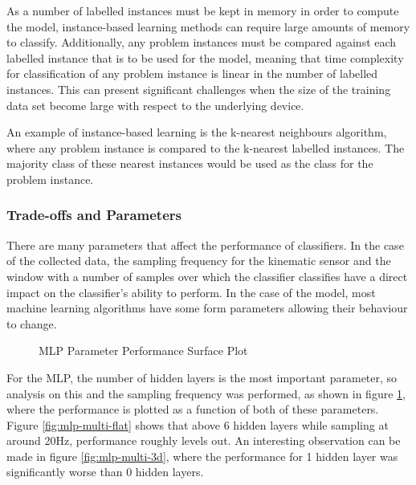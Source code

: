 As a number of labelled instances must be kept in memory in order to compute the model, instance-based learning methods can require large amounts of memory to classify. Additionally, any problem instances must be compared against each labelled instance that is to be used for the model, meaning that time complexity for classification of any problem instance is linear in the number of labelled instances. This can present significant challenges when the size of the training data set become large with respect to the underlying device.

An example of instance-based learning is the k-nearest neighbours algorithm, where any problem instance is compared to the k-nearest labelled instances. The majority class of these nearest instances would be used as the class for the problem instance.

\subsubsection{Trade-offs and Parameters \label{sec:trade-off-parameters}}

There are many parameters that affect the performance of classifiers. In the case of the collected data, the sampling frequency for the kinematic sensor and the window with a number of samples over which the classifier classifies have a direct impact on the classifier's ability to perform. In the case of the model, most machine learning algorithms have some form parameters allowing their behaviour to change. 

\begin{figure}
	\centering
	\caption{MLP Parameter Performance Surface Plot \label{fig:mlp-multi}}
\end{figure}

For the MLP, the number of hidden layers is the most important parameter, so analysis on this and the sampling frequency was performed, as shown in figure \ref{fig:mlp-multi}, where the performance is plotted as a function of both of these parameters. Figure \ref{fig:mlp-multi-flat} shows that above 6 hidden layers while sampling at around 20Hz, performance roughly levels out. An interesting observation can be made in figure \ref{fig:mlp-multi-3d}, where the performance for 1 hidden layer was significantly worse than 0 hidden layers.

